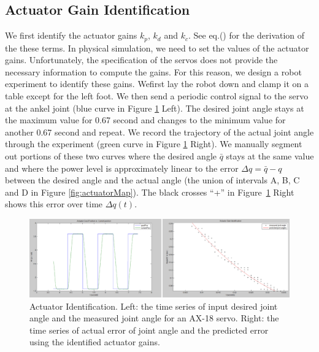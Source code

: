 \subsection{Actuator Gain Identification}
We first identify the actuator gains $k_p$, $k_d$ and $k_c$. See eq.() for the derivation of the these terms. In physical simulation, we need to set the values of the actuator gains. Unfortunately, the specification of the servos does not provide the necessary information to compute the gains. For this reason, we design a robot experiment to identify these gains. Wefirst lay the robot down and clamp it on a table except for the left foot. We then send a periodic control signal to the servo at the ankel joint (blue curve in Figure \ref{fig:actuatorId} Left). The desired joint angle stays at the maximum value for 0.67 second and changes to the minimum value for another 0.67 second and repeat. We record the trajectory of the actual joint angle through the experiment (green curve in Figure \ref{fig:actuatorId} Right). We manually segment out portions of these two curves where the desired angle $\bar{q}$ stays at the same value and where the power level is approximately linear to the error $\Delta q = \bar{q} - q$ between the desired angle and the actual angle (the union of intervals A, B, C and D in Figure \ref{fig:actuatorMap}). The black crosses ``+'' in Figure~\ref{fig:actuatorId} Right shows this error over time $\Delta q(t)$.

\begin{figure}[!t]
  \centering
  \includegraphics[width=\textwidth]{figures/actuatorId}
  \caption{Actuator Identification. Left: the time series of input desired joint angle and the measured joint angle for an AX-18 servo. Right: the time series of actual error of joint angle and the predicted error using the identified actuator gains.  }
  \label{fig:actuatorId}
\end{figure}

